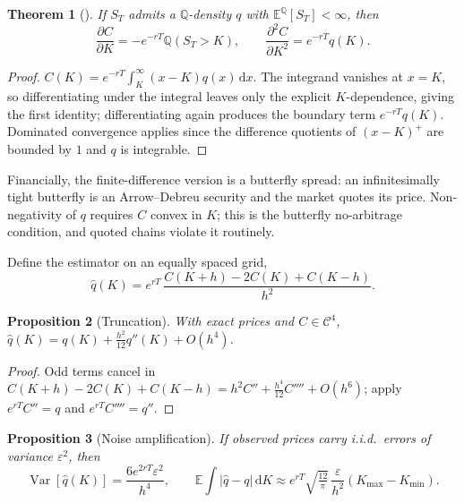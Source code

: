 \documentclass[11pt,a4paper]{article}
\newtheorem{theorem}{Theorem}[section]
\newtheorem{proposition}[theorem]{Proposition}
\theoremstyle{remark}
\newcommand{\Q}{\mathbb{Q}}
\newcommand{\E}{\mathbb{E}}
\newcommand{\dd}{\,\mathrm{d}}
\begin{document}
\begin{theorem}[\citealp{breeden1978}]
\label{thm:bl}
If $S_T$ admits a $\Q$-density $q$ with $\E^\Q[S_T]<\infty$, then
\begin{equation}
\frac{\partial C}{\partial K} = -e^{-rT}\Q(S_T>K),
\qquad
\frac{\partial^2 C}{\partial K^2} = e^{-rT} q(K).
\end{equation}
\end{theorem}

\begin{proof}
$C(K) = e^{-rT}\int_K^\infty (x-K)q(x)\dd x$. The integrand vanishes at $x=K$,
so differentiating under the integral leaves only the explicit $K$-dependence,
giving the first identity; differentiating again produces the boundary term
$e^{-rT}q(K)$. Dominated convergence applies since the difference quotients of
$(x-K)^+$ are bounded by $1$ and $q$ is integrable.
\end{proof}

Financially, the finite-difference version is a butterfly spread: an
infinitesimally tight butterfly is an Arrow--Debreu security and the market
quotes its price. Non-negativity of $q$ requires $C$ convex in $K$; this is the
butterfly no-arbitrage condition, and quoted chains violate it routinely.

Define the estimator on an equally spaced grid,
\begin{equation}
\label{eq:estimator}
\hat q(K) = e^{rT}\,\frac{C(K+h)-2C(K)+C(K-h)}{h^2}.
\end{equation}

\begin{proposition}[Truncation]
\label{prop:trunc}
With exact prices and $C\in\mathcal{C}^4$,
$\hat q(K) = q(K) + \tfrac{h^2}{12}q''(K) + O(h^4)$.
\end{proposition}

\begin{proof}
Odd terms cancel in $C(K+h)-2C(K)+C(K-h) = h^2C'' + \tfrac{h^4}{12}C'''' +
O(h^6)$; apply $e^{rT}C''=q$ and $e^{rT}C''''=q''$.
\end{proof}

\begin{proposition}[Noise amplification]
\label{prop:noise}
If observed prices carry i.i.d.\ errors of variance $\varepsilon^2$, then
\begin{equation}
\label{eq:noisevar}
\operatorname{Var}[\hat q(K)] = \frac{6e^{2rT}\varepsilon^2}{h^4},
\qquad
\E\!\int|\hat q - q|\dd K \approx
e^{rT}\sqrt{\tfrac{12}{\pi}}\,\frac{\varepsilon}{h^2}(K_{\max}-K_{\min}).
\end{equation}
\end{proposition}
\end{document}
